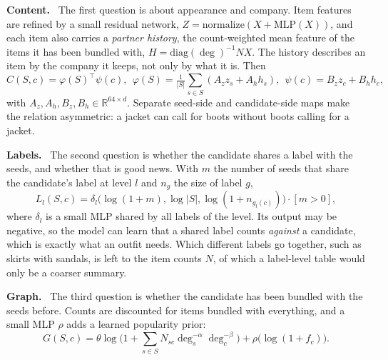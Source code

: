 \documentclass[runningheads]{llncs}
\newcommand{\R}{\mathbb{R}}
\newcommand{\deltab}{\delta}
\renewcommand{\paragraph}[1]{\smallskip\noindent\textbf{#1}\ }
\begin{document}
\paragraph{Content.} The first question is about appearance and company. Item features are refined by a small
residual network, $Z=\mathrm{normalize}(X+\mathrm{MLP}(X))$, and each item also carries a \emph{partner history}, the
count-weighted mean feature of the items it has been bundled with, $H=\mathrm{diag}(\deg)^{-1}NX$. The history
describes an item by the company it keeps, not only by what it is. Then
\begin{equation}
C(S,c)=\varphi(S)^{\top}\psi(c),\ \ \varphi(S)=\tfrac{1}{|S|}\textstyle\sum_{s\in S}(A_z z_s+A_h h_s),\ \
\psi(c)=B_z z_c+B_h h_c,
\end{equation}
with $A_z,A_h,B_z,B_h\in\R^{64\times d}$. Separate seed-side and candidate-side maps make the relation asymmetric: a
jacket can call for boots without boots calling for a jacket.

\paragraph{Labels.} The second question is whether the candidate shares a label with the seeds, and whether that is
good news. With $m$ the number of seeds that share the candidate's label at level $l$ and $n_g$ the size of label $g$,
\begin{equation}
L_l(S,c)=\deltab_l\big(\log(1+m),\log|S|,\log(1+n_{g_l(c)})\big)\cdot[m>0],
\end{equation}
where $\deltab_l$ is a small MLP shared by all labels of the level. Its output may be negative, so the model can learn
that a shared label counts \emph{against} a candidate, which is exactly what an outfit needs. Which different labels
go together, such as skirts with sandals, is left to the item counts $N$, of which a label-level table would only be
a coarser summary.

\paragraph{Graph.} The third question is whether the candidate has been bundled with the seeds before. Counts are
discounted for items bundled with everything, and a small MLP $\rho$ adds a learned popularity prior:
\begin{equation}
G(S,c)=\theta\log\Big(1+\textstyle\sum_{s\in S}N_{sc}\deg_s^{-\alpha}\deg_c^{-\beta}\Big)+\rho\big(\log(1+f_c)\big).
\end{equation}
\end{document}
